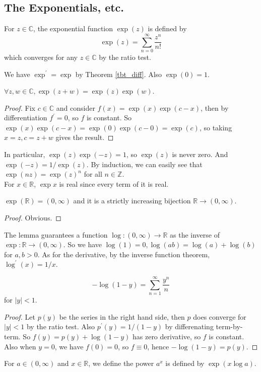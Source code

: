 \subsection{The Exponentials, etc.}
\begin{definition}
    For $z\in\mathbb C$, the exponential function $\exp(z)$ is defined by
    $$\exp(z)=\sum_{n=0}^\infty\frac{z^n}{n!}$$
    which converges for any $z\in\mathbb C$ by the ratio test.
\end{definition}
We have $\exp^\prime=\exp$ by Theorem \ref{tbt_diff}.
Also $\exp(0)=1$.
\begin{proposition}
    $\forall z,w\in\mathbb C,\exp(z+w)=\exp(z)\exp(w)$.
\end{proposition}
\begin{proof}
    Fix $c\in\mathbb C$ and consider $f(x)=\exp(x)\exp(c-x)$, then by differentiation $f^\prime=0$, so $f$ is constant.
    So $\exp(x)\exp(c-x)=\exp(0)\exp(c-0)=\exp(c)$, so taking $x=z,c=z+w$ gives the result.
\end{proof}
In particular, $\exp(z)\exp(-z)=1$, so $\exp(z)$ is never zero.
And $\exp(-z)=1/\exp(z)$.
By induction, we can easily see that $\exp(nz)=\exp(z)^n$ for all $n\in\mathbb Z$.\\
For $x\in\mathbb R$, $\exp x$ is real since every term of it is real.
\begin{lemma}
    $\exp(\mathbb R)=(0,\infty)$ and it is a strictly increasing bijection $\mathbb R\to (0,\infty)$.
\end{lemma}
\begin{proof}
    Obvious.
\end{proof}
The lemma guarantees a function $\log:(0,\infty)\to\mathbb R$ as the inverse of $\exp:\mathbb R\to (0,\infty)$.
So we have $\log(1)=0,\log(ab)=\log(a)+\log(b)$ for $a,b>0$.
As for the derivative, by the inverse function theorem, $\log^\prime(x)=1/x$.
\begin{proposition}
    $$-\log(1-y)=\sum_{n=1}^\infty\frac{y^n}{n}$$
    for $|y|<1$.
\end{proposition}
\begin{proof}
    Let $p(y)$ be the series in the right hand side, then $p$ does converge for $|y|<1$ by the ratio test.
    Also $p^\prime(y)=1/(1-y)$ by differenating term-by-term.
    So $f(y)=p(y)+\log(1-y)$ has zero derivative, so $f$ is constant.
    Also when $y=0$, we have $f(0)=0$, so $f\equiv 0$, hence $-\log(1-y)=p(y)$.
\end{proof}
\begin{definition}
    For $a\in (0,\infty)$ and $x\in\mathbb R$, we define the power $a^x$ is defined by $\exp(x\log a)$.
\end{definition}
